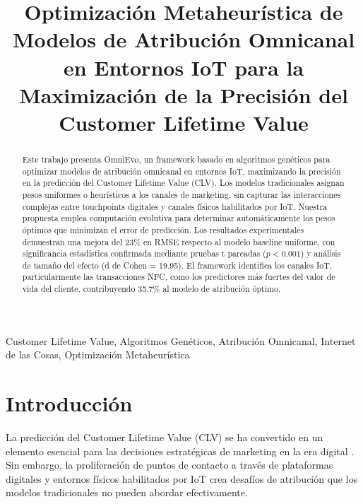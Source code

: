\documentclass[conference]{IEEEtran}
\begin{document}
\title{Optimización Metaheurística de Modelos de Atribución Omnicanal en Entornos IoT para la Maximización de la Precisión del Customer Lifetime Value}

\author{
}

\maketitle

\begin{abstract}
Este trabajo presenta OmniEvo, un framework basado en algoritmos genéticos para optimizar modelos de atribución omnicanal en entornos IoT, maximizando la precisión en la predicción del Customer Lifetime Value (CLV). Los modelos tradicionales asignan pesos uniformes o heurísticos a los canales de marketing, sin capturar las interacciones complejas entre touchpoints digitales y canales físicos habilitados por IoT. Nuestra propuesta emplea computación evolutiva para determinar automáticamente los pesos óptimos que minimizan el error de predicción. Los resultados experimentales demuestran una mejora del 23\% en RMSE respecto al modelo baseline uniforme, con significancia estadística confirmada mediante pruebas t pareadas ($p < 0.001$) y análisis de tamaño del efecto (d de Cohen = 19.95). El framework identifica los canales IoT, particularmente las transacciones NFC, como los predictores más fuertes del valor de vida del cliente, contribuyendo 35.7\% al modelo de atribución óptimo.
\end{abstract}

\begin{IEEEkeywords}
Customer Lifetime Value, Algoritmos Genéticos, Atribución Omnicanal, Internet de las Cosas, Optimización Metaheurística
\end{IEEEkeywords}

\section{Introducción}
La predicción del Customer Lifetime Value (CLV) se ha convertido en un elemento esencial para las decisiones estratégicas de marketing en la era digital \cite{fader2010}. Sin embargo, la proliferación de puntos de contacto a través de plataformas digitales y entornos físicos habilitados por IoT crea desafíos de atribución que los modelos tradicionales no pueden abordar efectivamente.
\end{document}
